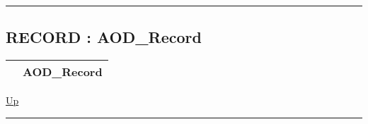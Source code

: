 \rule{\textwidth}{0.4pt}
\subsection*{RECORD : AOD\_Record}
\hypertarget{ecldoc:logisticregression.types.aod_record}{}

{\renewcommand{\arraystretch}{1.5}
\begin{tabularx}{\textwidth}{|>{\raggedright\arraybackslash}l|X|}
\hline
\hspace{0pt} & AOD\_Record \\
\hline
\end{tabularx}
}

\hyperlink{ecldoc:LogisticRegression.Types}{Up}

\par


\rule{\textwidth}{0.4pt}


